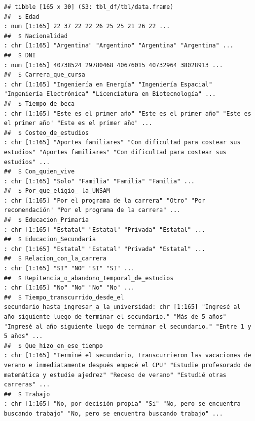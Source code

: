 \documentclass[
]{article}
\begin{document}
\begin{verbatim}
## tibble [165 x 30] (S3: tbl_df/tbl/data.frame)
##  $ Edad                                                                   : num [1:165] 22 37 22 22 26 25 25 21 26 22 ...
##  $ Nacionalidad                                                           : chr [1:165] "Argentina" "Argentino" "Argentina" "Argentina" ...
##  $ DNI                                                                    : num [1:165] 40738524 29780468 40676015 40732964 38028913 ...
##  $ Carrera_que_cursa                                                      : chr [1:165] "Ingeniería en Energía" "Ingeniería Espacial" "Ingeniería Electrónica" "Licenciatura en Biotecnología" ...
##  $ Tiempo_de_beca                                                         : chr [1:165] "Este es el primer año" "Este es el primer año" "Este es el primer año" "Este es el primer año" ...
##  $ Costeo_de_estudios                                                     : chr [1:165] "Aportes familiares" "Con dificultad para costear sus estudios" "Aportes familiares" "Con dificultad para costear sus estudios" ...
##  $ Con_quien_vive                                                         : chr [1:165] "Solo" "Familia" "Familia" "Familia" ...
##  $ Por_que_eligio_ la_UNSAM                                               : chr [1:165] "Por el programa de la carrera" "Otro" "Por recomendación" "Por el programa de la carrera" ...
##  $ Educacion_Primaria                                                     : chr [1:165] "Estatal" "Estatal" "Privada" "Estatal" ...
##  $ Educacion_Secundaria                                                   : chr [1:165] "Estatal" "Estatal" "Privada" "Estatal" ...
##  $ Relacion_con_la_carrera                                                : chr [1:165] "SI" "NO" "SI" "SI" ...
##  $ Repitencia_o_abandono_temporal_de_estudios                             : chr [1:165] "No" "No" "No" "No" ...
##  $ Tiempo_transcurrido_desde_el secundario_hasta_ingresar_a_la_universidad: chr [1:165] "Ingresé al año siguiente luego de terminar el secundario." "Más de 5 años" "Ingresé al año siguiente luego de terminar el secundario." "Entre 1 y 5 años" ...
##  $ Que_hizo_en_ese_tiempo                                                 : chr [1:165] "Terminé el secundario, transcurrieron las vacaciones de verano e inmediatamente después empecé el CPU" "Estudie profesorado de matemática y estudie ajedrez" "Receso de verano" "Estudié otras carreras" ...
##  $ Trabajo                                                                : chr [1:165] "No, por decisión propia" "Si" "No, pero se encuentra buscando trabajo" "No, pero se encuentra buscando trabajo" ...

\end{verbatim}
\end{document}
